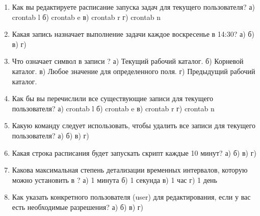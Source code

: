 \documentclass[letterpaper,10pt,russian]{sphinxmanual}
\begin{document}
\begin{enumerate}
\item {} 
\sphinxAtStartPar
Как вы редактируете расписание запуска задач  для текущего пользователя?
а) crontab \sphinxhyphen{}l
б) crontab \sphinxhyphen{}e
в) crontab \sphinxhyphen{}r
г) crontab \sphinxhyphen{}n

\item {} 
\sphinxAtStartPar
Какая запись  назначает выполнение задачи каждое воскресенье в 14:30?
а) 
б) 
в) 
г) 

\item {} 
\sphinxAtStartPar
Что означает символ \sphinxcode{\sphinxupquote{*}} в записи ?
а) Текущий рабочий каталог.
б) Корневой каталог.
в) Любое значение для определенного поля.
г) Предыдущий рабочий каталог.

\item {} 
\sphinxAtStartPar
Как бы вы перечислили все существующие записи  для текущего пользователя?
а) crontab \sphinxhyphen{}l
б) crontab \sphinxhyphen{}e
в) crontab \sphinxhyphen{}r
г) crontab \sphinxhyphen{}n

\item {} 
\sphinxAtStartPar
Какую команду следует использовать, чтобы удалить все записи  для текущего пользователя?
а) 
б) 
в) 
г) 

\item {} 
\sphinxAtStartPar
Какая строка расписания  будет запускать скрипт каждые 10 минут?
а) 
б) 
в) 
г) 

\item {} 
\sphinxAtStartPar
Какова максимальная степень детализации временных интервалов, которую можно установить в ?
а) 1 минута
б) 1 секунда
в) 1 час
г) 1 день

\item {} 
\sphinxAtStartPar
Как указать  конкретного пользователя (user) для редактирования, если у вас есть необходимые разрешения?
а) 
б) 
в) 
г) 


\end{enumerate}
\end{document}

